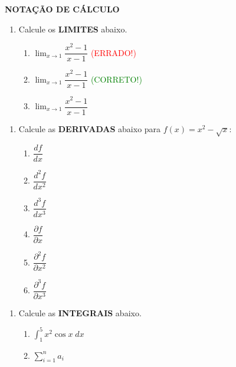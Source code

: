\documentclass[12pt,a4paper]{article}
\DeclareMathOperator{\limite}{\displaystyle\lim}
\DeclareMathOperator{\integral}{\displaystyle\int}
\begin{document}
    \textbf{NOTAÇÃO DE CÁLCULO}
    \begin{enumerate}
        \item Calcule os \textbf{LIMITES} abaixo.
        \begin{enumerate}
            \item $\lim_{x \to 1} \dfrac{x^2 - 1}{x-1}$ \textcolor{red}{(ERRADO!)}
            \item $\displaystyle\lim_{x \to 1} \dfrac{x^2 - 1}{x-1}$ \textcolor{green}{(CORRETO!)}
            \item $\limite_{x \to 1} \dfrac{x^2 - 1}{x-1}$
        \end{enumerate}
    \end{enumerate}
    
    \begin{enumerate}
        \item Calcule as \textbf{DERIVADAS} abaixo para $f(x) = x^2 - \sqrt{x}$:
        \begin{enumerate}
            \item $\dfrac{df}{dx}$
            \item $\dfrac{d^2f}{dx^2}$
            \item $\dfrac{d^3f}{dx^3}$
            
            \item $\dfrac{\partial f}{\partial x}$
            \item $\dfrac{\partial^2f}{\partial x^2}$
            \item $\dfrac{\partial^3f}{\partial x^3}$
        \end{enumerate}
    \end{enumerate}
    
    \begin{enumerate}
        \item Calcule as \textbf{INTEGRAIS} abaixo.
        \begin{enumerate}
            \item $\integral_1^5 x^2\cos x \; dx$
            \item $\displaystyle\sum_{i=1}^n a_i$
        \end{enumerate}
    \end{enumerate}
\end{document}
